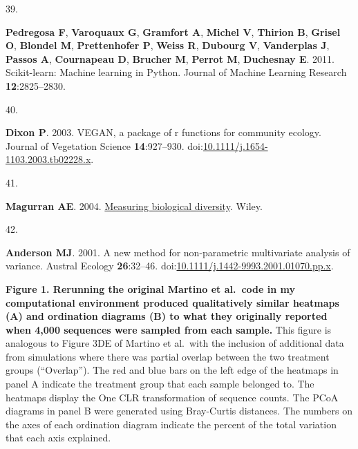 \documentclass[
  11pt,
]{article}
\newlength{\cslhangindent}
\newlength{\csllabelwidth}
\newenvironment{CSLReferences}[2] %
 {\begin{list}{}{%
  \setlength{\itemindent}{0pt}
  \setlength{\leftmargin}{0pt}
  \setlength{\parsep}{0pt}
  \ifodd #1
   \setlength{\leftmargin}{\cslhangindent}
   \setlength{\itemindent}{-1\cslhangindent}
  \fi
  \setlength{\itemsep}{#2\baselineskip}}}
 {\end{list}}
\newcommand{\CSLLeftMargin}[1]{\parbox[t]{\csllabelwidth}{\strut#1\strut}}
\newcommand{\CSLRightInline}[1]{\parbox[t]{\linewidth - \csllabelwidth}{\strut#1\strut}}
\begin{document}
\begin{CSLReferences}{0}{1}
\CSLLeftMargin{39. }%
\CSLRightInline{\textbf{Pedregosa F}, \textbf{Varoquaux G},
\textbf{Gramfort A}, \textbf{Michel V}, \textbf{Thirion B},
\textbf{Grisel O}, \textbf{Blondel M}, \textbf{Prettenhofer P},
\textbf{Weiss R}, \textbf{Dubourg V}, \textbf{Vanderplas J},
\textbf{Passos A}, \textbf{Cournapeau D}, \textbf{Brucher M},
\textbf{Perrot M}, \textbf{Duchesnay E}. 2011. Scikit-learn: Machine
learning in {P}ython. Journal of Machine Learning Research
\textbf{12}:2825--2830.}

\CSLLeftMargin{40. }%
\CSLRightInline{\textbf{Dixon P}. 2003. {VEGAN}, a package of r
functions for community ecology. Journal of Vegetation Science
\textbf{14}:927--930.
doi:\href{https://doi.org/10.1111/j.1654-1103.2003.tb02228.x}{10.1111/j.1654-1103.2003.tb02228.x}.}

\CSLLeftMargin{41. }%
\CSLRightInline{\textbf{Magurran AE}. 2004.
\href{https://books.google.com/books?id=tUqzLSUzXxcC}{Measuring
biological diversity}. Wiley.}

\CSLLeftMargin{42. }%
\CSLRightInline{\textbf{Anderson MJ}. 2001. A new method for
non-parametric multivariate analysis of variance. Austral Ecology
\textbf{26}:32--46.
doi:\href{https://doi.org/10.1111/j.1442-9993.2001.01070.pp.x}{10.1111/j.1442-9993.2001.01070.pp.x}.}

\end{CSLReferences}

\newpage{}

\textbf{Figure 1. Rerunning the original Martino et al.~code in my
computational environment produced qualitatively similar heatmaps (A)
and ordination diagrams (B) to what they originally reported when 4,000
sequences were sampled from each sample.} This figure is analogous to
Figure 3DE of Martino et al.~with the inclusion of additional data from
simulations where there was partial overlap between the two treatment
groups (``Overlap''). The red and blue bars on the left edge of the
heatmaps in panel A indicate the treatment group that each sample
belonged to. The heatmaps display the One CLR transformation of sequence
counts. The PCoA diagrams in panel B were generated using Bray-Curtis
distances. The numbers on the axes of each ordination diagram indicate
the percent of the total variation that each axis explained.
\end{document}
